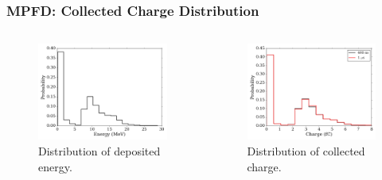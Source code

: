 \documentclass[fleqn]{beamer}
\begin{document}
\begin{frame}
 \frametitle{MPFD: Collected Charge Distribution}
 \begin{columns}[c]
  \begin{column}{.5\textwidth}
   \begin{figure}
   \centering
    \includegraphics[width = \textwidth]{micro_erg_dist}
    \caption{Distribution of deposited energy.}
   \end{figure}
  \end{column}
  
  \begin{column}{.5\textwidth}
   \begin{figure}
    \centering
    \includegraphics[width = \textwidth]{micro_charge_dist}
    \caption{Distribution of collected charge.}
   \end{figure}

  \end{column}


 \end{columns}

\end{frame}
\end{document}
